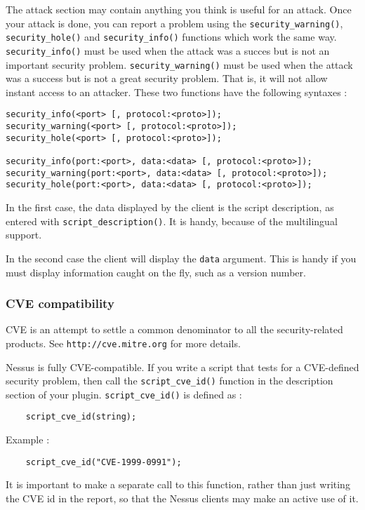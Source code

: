 \documentclass{article}
\begin{document}
The attack section may contain anything you think is useful for an attack. Once
your attack is done, you can report a problem using the
\verb+security_warning()+, \verb+security_hole()+ and \verb+security_info()+ 
functions which work the same way. \verb+security_info()+ must be used when
the attack was a succes but is not an important security problem.
\verb+security_warning()+ must be used when the attack was a success
but is not a great security problem. That is, it will not allow instant access
to an attacker. These two functions have the following syntaxes :
\begin{verbatim}
security_info(<port> [, protocol:<proto>]);
security_warning(<port> [, protocol:<proto>]);
security_hole(<port> [, protocol:<proto>]);

security_info(port:<port>, data:<data> [, protocol:<proto>]);
security_warning(port:<port>, data:<data> [, protocol:<proto>]);
security_hole(port:<port>, data:<data> [, protocol:<proto>]);
\end{verbatim}

In the first case, the data displayed by the client is the script
description, as entered with \verb+script_description()+. It is handy, because
of the multilingual support. 

In the second case the client will display the \verb+data+ argument. This
is handy if you must display information caught on the fly, such as a version
number.

\subsubsection{CVE compatibility}

CVE is an attempt to settle a common denominator to all the security-related
products. See \verb+http://cve.mitre.org+ for more details.

Nessus is fully CVE-compatible. If you write a script that tests
for a CVE-defined security problem, then call the \verb+script_cve_id()+
function in the description section of your plugin.
\verb+script_cve_id()+ is defined as : 
\begin{verbatim}
	script_cve_id(string);
\end{verbatim}

Example :
\begin{verbatim}
	script_cve_id("CVE-1999-0991");
\end{verbatim}

It is important to make a separate call to this function, rather than
just writing the CVE id in the report, so that the Nessus clients may
make an active use of it.
\end{document}
